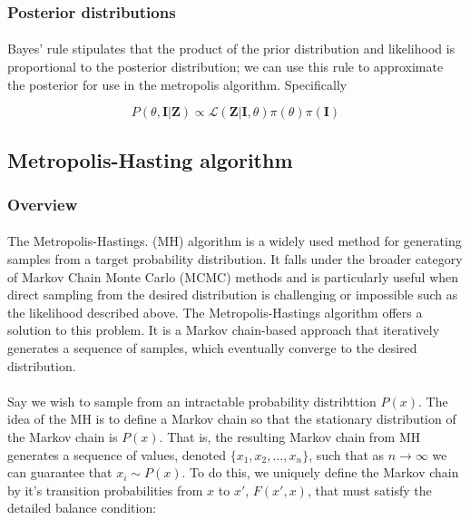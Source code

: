 \documentclass{article}
\begin{document}
\subsubsection{Posterior distributions}

\paragraph{}Bayes' rule stipulates that the product of the prior distribution and likelihood is proportional to the posterior distribution; we can use this rule to approximate the posterior for use in the metropolis algorithm. Specifically 

\begin{equation}
\label{eq:bayes}
P(\theta, \mathbf{I} | \mathbf{Z}) \propto \mathcal{L}(\mathbf{Z} | \mathbf{I}, \theta)\pi(\theta)\pi(\mathbf{I})
\end{equation}


\subsection{Metropolis-Hasting algorithm}

\subsubsection{Overview}
\paragraph{} The Metropolis-Hastings. (MH) algorithm is a widely used method for generating samples from a target probability distribution. It falls under the broader category of Markov Chain Monte Carlo (MCMC) methods and is particularly useful when direct sampling from the desired distribution is challenging or impossible such as the likelihood described above. The Metropolis-Hastings algorithm offers a solution to this problem. It is a Markov chain-based approach that iteratively generates a sequence of samples, which eventually converge to the desired distribution. 

\paragraph{}Say we wish to sample from an intractable probability distribttion $P(x)$. The idea of the MH is to define a Markov chain so that the stationary distribution of the Markov chain is $P(x)$. That is, the resulting Markov chain from MH generates a sequence of values, denoted $\{x_1, x_2, \dots,  x_n\}$, such that as $n \rightarrow \infty$ we can guarantee that $x_i \sim P(x)$. To do this, we uniquely define the Markov chain by it's transition probabilities from $x$ to $x'$, $F(x', x)$, that must satisfy the detailed balance condition:
\end{document}
